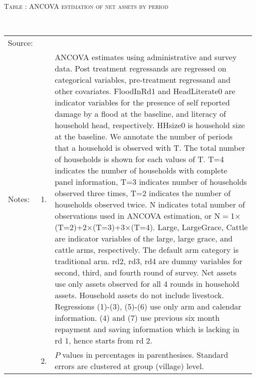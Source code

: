 \hspace{-1cm}\begin{minipage}[t]{14cm}
\hfil\textsc{\normalsize Table \thetable: ANCOVA estimation of net assets by period\label{tab ANCOVA narrow net assets timevarying}}\\
\setlength{\tabcolsep}{1pt}
\setlength{\baselineskip}{8pt}
\renewcommand{\arraystretch}{.55}
\hfil{}\\
\renewcommand{\arraystretch}{.8}
\setlength{\tabcolsep}{1pt}
\begin{tabular}{>{\hfill\scriptsize}p{1cm}<{}>{\hfill\scriptsize}p{.25cm}<{}>{\scriptsize}p{12cm}<{\hfill}}
Source:& \multicolumn{2}{l}{\scriptsize Estimated with GUK administrative and survey data.}\\
Notes: & 1. & ANCOVA estimates using administrative and survey data. Post treatment regressands are regressed on categorical variables, pre-treatment regressand and other covariates. \textsf{FloodInRd1} and \textsf{HeadLiterate0} are indicator variables for the presence of self reported damage by a flood at the baseline, and literacy of household head, respectively. \textsf{HHsize0} is household size at the baseline. We annotate the number of periods that a household is observed with \textsf{T}. The total number of households is shown for each values of \textsf{T}. \textsf{T=4} indicates the number of households with complete panel information, \textsf{T=3} indicates number of households observed three times, \textsf{T=2} indicates the number of households observed twice. \textsf{N} indicates total number of observations used in ANCOVA estimation, or \textsf{N$=$1$\times$(T=2)+2$\times$(T=3)+3$\times$(T=4)}.  \textsf{Large}, \textsf{LargeGrace}, \textsf{Cattle} are indicator variables of the \textsf{large}, \textsf{large grace}, and \textsf{cattle} arms, respectively. The default arm category is \textsf{traditional} arm. \textsf{rd2, rd3, rd4} are dummy variables for second, third, and fourth round of survey. Net assets use only assets observed for all 4 rounds in household assets. Household assets do not include livestock. Regressions (1)-(3), (5)-(6) use only arm and calendar information. (4) and (7) use previous six month repayment and saving information which is lacking in rd 1, hence starts from rd 2.\\
& 2. & $P$ values in percentages in parenthesises. Standard errors are clustered at group (village) level.
\end{tabular}
\end{minipage}

